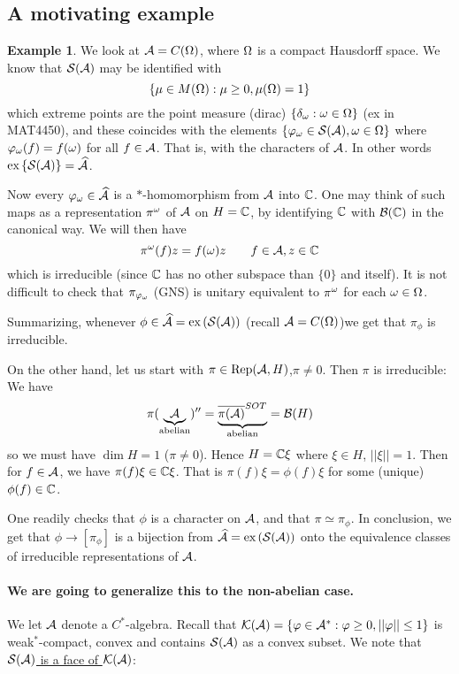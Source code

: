 \documentclass[10pt,english,a4paper]{article}
\theoremstyle{definition}
\newtheorem*{example}{Example}
\def\ex{\textnormal{ex}\,}
\def\whAs{\widehat{\As}}
\DeclareMathOperator{\Rep}{Rep}
\def\vphi{\varphi}
\begin{document}
\subsection*{A motivating example}
\begin{example}
We look at $\mathcal{A} = C(\Omega)$, where $\Omega$ is a compact Hausdorff space. 
We know that $\mathcal{S}(\mathcal{A})$ may be identified with 
\[ \{ \mu \in M(\Omega) : \mu \geq 0, \mu(\Omega) =1\} \] 
which extreme points are the point measure (dirac) 
$\{\delta_{\omega}: \omega \in \Omega\}$ (ex in MAT4450), and these coincides with 
the elements $\{ \vphi_{\om} \in \Ss(\As), \om \in \Om \}$
where $\vphi_{\om}(f) = f(\om)$ for all $f \in \mathcal{A}$.
That is, with the characters of $\mathcal{A}$. In other words
$\ex \{\Ss(\As)\} = \widehat{\As}$.

Now every $\vphi_{\om} \in \whAs$ is a $*$-homomorphism from $\mathcal{A}$ into 
$\mathbb{C}$. One may think of such maps as a representation $\pi^{\omega}$ of $\mathcal{A}$
on $H=\mathbb{C}$, by identifying $\mathbb{C}$ with $\mathcal{B}(\mathbb{C})$ in the canonical way. 
We will then have 
\[ \pi^{\omega}(f)z = f(\omega)z\qquad f \in \mathcal{A}, z\in \mathbb{C} \]
which is irreducible (since $\mathbb{C}$ has no other subspace than $\{0\}$ and itself).
It is not difficult to check that $\pi_{\vphi_{\om}}$ (GNS) is unitary equivalent 
to $\pi^{\omega}$ for each $\omega \in \Omega$.

Summarizing, whenever $\phi \in \whAs = \ex(\Ss(\As))$ (recall $\mathcal{A} =
C(\Omega)$)we get that $\pi_{\phi}$ is irreducible.

On the other hand, let us start with $\pi \in \Rep(\As,H)$,$\pi\neq 0$.
Then $\pi$ is irreducible: 
We have 
\[\pi(\underbrace{\mathcal{A}}_{\text{abelian}})''=\underbrace{\overline{\pi(\mathcal{A})}^{SOT}}_{\text{abelian}} = \mathcal{B}(H)\]
so we must have $\dim H = 1$ ($\pi\neq 0$). Hence $H = \mathbb{C} \xi$ where $\xi \in
H$, $||\xi||=1$.
Then for $f \in \mathcal{A}$, we have $\pi(f)\xi \in \mathbb{C}\xi$. That is $\pi(f)\xi = \phi(f)\xi$
for some (unique) $\phi(f) \in \mathbb{C}$.

One readily checks that $\phi$ is a character on $\mathcal{A}$, and that $\pi\simeq \pi_{\phi}$.
In conclusion, we get that $\phi \to [\pi_{\phi}]$ is a bijection from $\whAs = \ex(\Ss(\As))$
onto the equivalence classes of irreducible representations of $\mathcal{A}$. 
\end{example}

\paragraph{We are going 
to generalize this to the non-abelian case.}

We let $\mathcal{A}$ denote a $C^*$-algebra. Recall that 
$\Ks(\As) = \{\vphi \in \As^* : \vphi\geq 0, ||\vphi||\leq 1\}$ 
is weak$^*$-compact, convex and contains $\mathcal{S}(\mathcal{A})$ as a convex subset. 
We note that \ul{$\mathcal{S}(\mathcal{A})$ is a face of $\mathcal{K}(\mathcal{A})$}:
\end{document}
